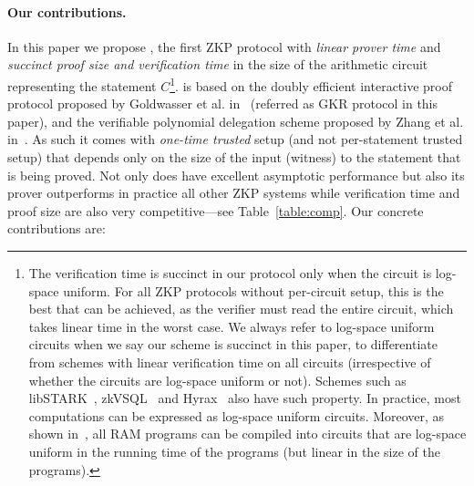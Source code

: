 \paragraph{Our contributions.} In this paper we propose \name, the first ZKP protocol with \emph{linear prover time} and \emph{succinct proof size and verification time} in the size of the arithmetic circuit representing the statement $C$\footnote{The verification time is succinct in our protocol only when the circuit is log-space uniform. For all ZKP protocols without per-circuit setup, this is the best that can be achieved, as the verifier must read the entire circuit, which takes linear time in the worst case. We always refer to log-space uniform circuits when we say our scheme is succinct in this paper, to differentiate from schemes with linear verification time on all circuits (irrespective of whether the circuits are log-space uniform or not). Schemes such as \textsf{libSTARK}~\cite{libstark}, \textsf{zkVSQL}~\cite{zkvpd} and \textsf{Hyrax}~\cite{hyrax} also have such property. In practice, most computations can be expressed as log-space uniform circuits. Moreover, as shown in~\cite{libsnark,vram,libstark}, all RAM programs  can be compiled into circuits that are log-space uniform in the running time of the programs (but linear in the size of the programs).}. \name is based on the doubly efficient interactive proof protocol proposed by Goldwasser et al. in~\cite{GKR} (referred as GKR protocol in this paper), and the verifiable polynomial delegation scheme proposed by Zhang et al. in~\cite{zhang2017vsql}. As such it comes with \emph{one-time trusted} setup (and not per-statement trusted setup) that depends only on the size of the input (witness) to the statement that is being proved. Not only does \name have excellent asymptotic performance but also its prover outperforms in practice all other ZKP systems while verification time and proof size are also very competitive---see Table~\ref{table:comp}. Our concrete contributions are:
